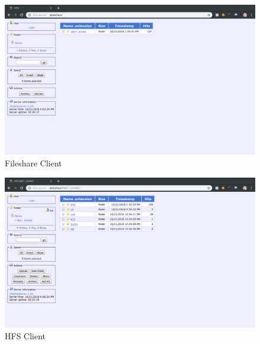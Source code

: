 \documentclass{article}
\begin{document}
\begin{figure}[H]
  \centering
  \includegraphics[scale=0.30]{./img/fileshare/01_htf_home.png}
  \caption{Fileshare Client}
  \label{fig:01_htf_home}
\end{figure}

\begin{figure}[H]
  \centering
  \includegraphics[scale=0.30]{./img/fileshare/02_hfs_abet_share.png}
  \caption{HFS Client}
  \label{fig:02_hfs_abet_share}
\end{figure}
\end{document}

